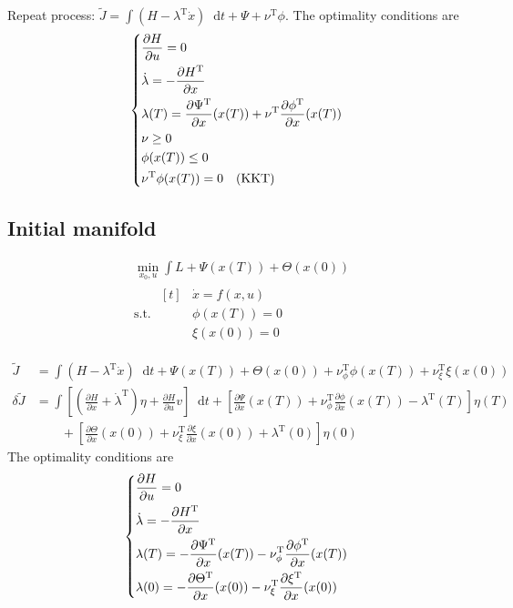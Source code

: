 \documentclass[letterpaper,12pt,titlepage]{report}
\newcommand*\dif{\mathop{}\!\mathrm{d}}
\newcommand{\trans}{^\text{T}}
\newcommand*\pder[2]{\frac{\partial #1}{\partial #2}}
\theoremstyle{plain}
\theoremstyle{definition}
\begin{document}
Repeat process: $\tilde J = \int(H-\lambda\trans\dot x)\dif t + \Psi + \nu\trans\phi$. The optimality conditions are
\[
  \begin{dcases}
    \pder{H}{u} = 0 \\
    \dot\lambda = -\pder{H\trans}{x} \\
    \lambda(T) = \pder{\Psi\trans}{x}(x(T)) + \nu\trans\pder{\phi\trans}{x}(x(T)) \\
    \nu \ge 0 \\
    \phi(x(T)) \le 0 \\
    \nu\trans \phi(x(T)) = 0 \quad (\text{KKT})
  \end{dcases}
\]

\subsection{Initial manifold}
\begin{align}
  & \min_{x_0,u} \int L + \Psi(x(T)) + \Theta(x(0)) \\
  & \text{s.t. } \begin{aligned}[t]
    & \dot x = f(x,u) \\
    & \phi(x(T)) = 0 \\
    & \xi(x(0)) = 0
  \end{aligned}
\end{align}

\begin{align}
  \tilde J &= \int (H-\lambda\trans\dot x)\dif t + \Psi(x(T)) + \Theta(x(0)) + \nu\trans_\phi \phi(x(T)) + \nu\trans_\xi \xi(x(0)) \\
  \delta \tilde J &= \int \left[ \left( \pder{H}{x} + \dot\lambda\trans \right) \eta + \pder{H}{u}v\right] \dif t + \left[ \pder{\Psi}{x}(x(T)) + \nu\trans_\phi \pder{\phi}{x}(x(T)) - \lambda\trans(T) \right] \eta(T) \\
           & \qquad + \left[ \pder{\Theta}{x}(x(0)) + \nu\trans_\xi \pder{\xi}{x}(x(0)) + \lambda\trans(0) \right] \eta(0)
\end{align}
The optimality conditions are
\[
  \begin{dcases}
    \pder{H}{u} = 0 \\
    \dot\lambda = -\pder{H\trans}{x} \\
    \lambda(T) = -\pder{\Psi\trans}{x}(x(T)) - \nu\trans_\phi \pder{\phi\trans}{x}(x(T)) \\
    \lambda(0) = -\pder{\Theta\trans}{x}(x(0)) - \nu\trans_\xi \pder{\xi\trans}{x}(x(0))
  \end{dcases}
\]
\end{document}
